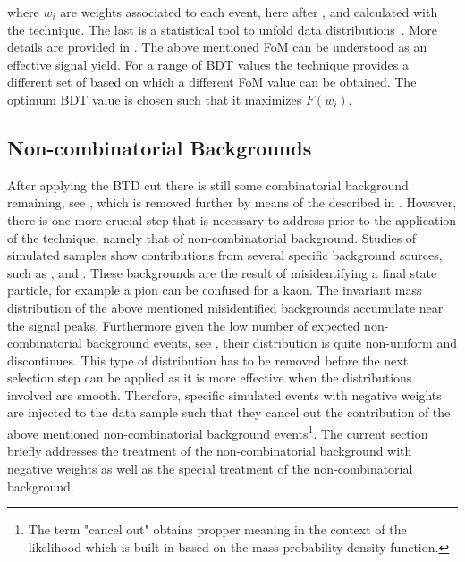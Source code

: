 \noindent where $w_i$ are weights associated to each event, here after \sWeights, and calculated with the
\sPlot technique. The last  is a statistical tool to unfold data distributions~\cite{splot}. More details are provided
in . The above mentioned FoM can be understood as an effective signal yield.
For a range of BDT values the \sPlot technique provides a different set of \sWeights based on which a different
FoM value can be obtained. The optimum BDT value is chosen such that it maximizes $F(w_i)$.

\subsection{Non-combinatorial Backgrounds}
\label{peaking_backgrounds}

After applying the BTD cut there is still some combinatorial background remaining, see , which is removed
further by means of the \sWeights described in . However, there is
one more crucial step that is necessary to address prior to the application of the \sPlot technique,
namely that of non-combinatorial background. Studies of simulated samples show contributions from
several specific background sources, such as \BsJpsiKK, \BsJpsipipi and \BdJpsipipi.
These backgrounds are the result of misidentifying a final state particle, for example a pion can
be confused for a kaon. The invariant mass distribution of the above mentioned misidentified backgrounds
accumulate near the \BJpsiKpi signal peaks. Furthermore given the low number of expected non-combinatorial background events,
see , their distribution is quite non-uniform and discontinues.
This type of distribution has to be removed before the next selection step can be applied as it is more effective
when the distributions involved are smooth. Therefore, specific simulated events with negative weights
are injected to the data sample such that they cancel out the contribution of the above mentioned non-combinatorial background
events\footnote{The term "cancel out" obtains propper meaning in the context of the likelihood which is built
in  based on the mass probability density function.}.
The current section briefly addresses the treatment of the non-combinatorial background with negative weights
as well as the special treatment of the \LbJpsippi non-combinatorial background.

